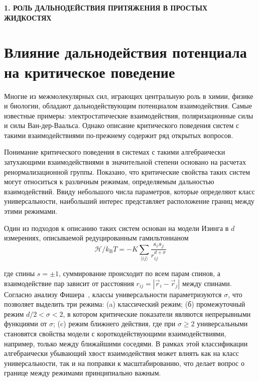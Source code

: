 \newpage
\begin{center}
  \textbf{\large 1. РОЛЬ ДАЛЬНОДЕЙСТВИЯ ПРИТЯЖЕНИЯ В ПРОСТЫХ ЖИДКОСТЯХ}
\end{center}


\section{Влияние дальнодействия потенциала на критическое поведение}

Многие из межмолекулярных сил, играющих центральную роль в химии, физике и биологии, обладают дальнодействующим потенциалом взаимодействия.
Самые известные примеры: электростатические взаимодействия, поляризационные силы и силы Ван-дер-Ваальса.
Однако описание критического поведения систем с такими взаимодействиями по-прежнему содержит ряд открытых вопросов.

Понимание критического поведения в системах с такими алгебраически затухающими взаимодействиями в значительной степени основано на расчетах ренормализационной группы.
Показано, что критические свойства таких систем могут относиться к различным режимам, определяемым дальностью взаимодействий.
Ввиду небольшого числа параметров, которые определяют класс универсальности, наибольший интерес представляет расположение границ между этими режимами.


Один из подходов к описанию таких систем основан на модели Изинга в $d$ измерениях, описываемой редуцированным гамильтонианом
\begin{equation}
  \mathcal{H} / k_{\mathrm{B}} T=-K \sum_{\langle i j\rangle} \frac{s_{i} s_{j}}{r_{i j}^{d+\sigma}}
  \label{eq1}
\end{equation}

где спины $s=\pm 1$, суммирование происходит по всем парам спинов, а взаимодействие пар зависит от расстояния $r_{i j}=\left|\vec {r}_{i}-\vec{r}_{j}\right|$ между спинами.
Согласно анализу Фишера~\cite{10.1103/PhysRevLett.29.917}, классы универсальности параметризуются $\sigma$, что позволяет выделить три режима: (a) классический режим; (б) промежуточный режим $d/2<\sigma<2$, в котором критические показатели являются непрерывными функциями от $\sigma$; (c) режим ближнего действия, где при $\sigma\geq 2$ универсальными становятся свойства модели с короткодействующими взаимодействиями, например, только между ближайшими соседями.
В рамках этой классификации алгебраически убывающий хвост взаимодействия может влиять как на класс универсальности, так и на поправки к масштабированию, что делает вопрос о границе между режимами принципиально важным.


